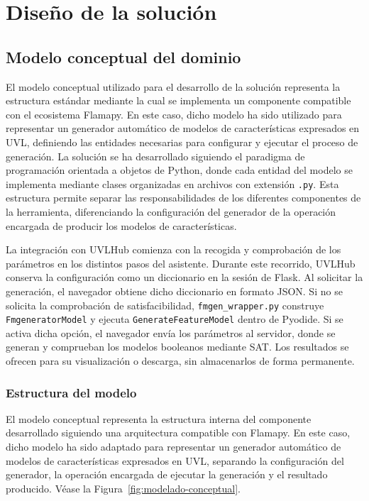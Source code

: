 \chapter{Diseño de la solución}
\label{chap:diseno}


\section{Modelo conceptual del dominio}
\label{sec:modelo_dominio}

El modelo conceptual utilizado para el desarrollo de la solución representa la estructura estándar mediante la cual se implementa un componente compatible con el ecosistema Flamapy. En este caso, dicho modelo ha sido utilizado para representar un generador automático de modelos de características expresados en UVL, definiendo las entidades necesarias para configurar y ejecutar el proceso de generación. La solución se ha desarrollado siguiendo el paradigma de programación orientada a objetos de Python, donde cada entidad del modelo se implementa mediante clases organizadas en archivos con extensión \texttt{.py}. Esta estructura permite separar las responsabilidades de los diferentes componentes de la herramienta, diferenciando la configuración del generador de la operación encargada de producir los modelos de características.

La integración con UVLHub comienza con la recogida y comprobación de los
parámetros en los distintos pasos del asistente. Durante este recorrido,
UVLHub conserva la configuración como un diccionario en la sesión de Flask.
Al solicitar la generación, el navegador obtiene dicho diccionario en formato
JSON. Si no se solicita la comprobación de satisfacibilidad,
\texttt{fmgen\_wrapper.py} construye \texttt{FmgeneratorModel} y ejecuta
\texttt{GenerateFeatureModel} dentro de Pyodide. Si se activa dicha opción,
el navegador envía los parámetros al servidor, donde se generan y comprueban
los modelos booleanos mediante SAT. Los resultados se ofrecen para su
visualización o descarga, sin almacenarlos de forma permanente.

\subsection{Estructura del modelo}
\label{subsec:estructura_modelo}

El modelo conceptual representa la estructura interna del componente desarrollado siguiendo una arquitectura compatible con Flamapy. En este caso, dicho modelo ha sido adaptado para representar un generador automático de modelos de características expresados en UVL, separando la configuración del generador, la operación encargada de ejecutar la generación y el resultado producido. Véase la Figura~\ref{fig:modelado-conceptual}.

